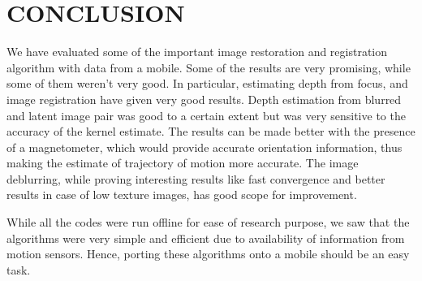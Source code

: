 \documentclass[BTech]{iitmdiss}
\begin{document}

\chapter{CONCLUSION}
\label{chap:conclusion}
We have evaluated some of the important image restoration and registration
algorithm with data from a mobile. Some of the results are very promising,
while some of them weren't very good. In particular, estimating depth
from focus, and image registration  have given 
very good results. Depth estimation from blurred and latent image pair
was good to a certain extent but was very sensitive to the accuracy of
the kernel estimate. The results can be made better with the presence
of a magnetometer, which would provide accurate orientation information,
thus making the estimate of trajectory of motion more accurate. The image deblurring, while proving interesting results like fast
convergence and better results in case of low texture images, has good 
scope for improvement.

While all the codes were run offline for ease of research purpose, we 
saw that the algorithms were very simple and efficient due to availability
of information from motion sensors. Hence, porting these algorithms onto
a mobile should be an easy task.  
\end{document}
